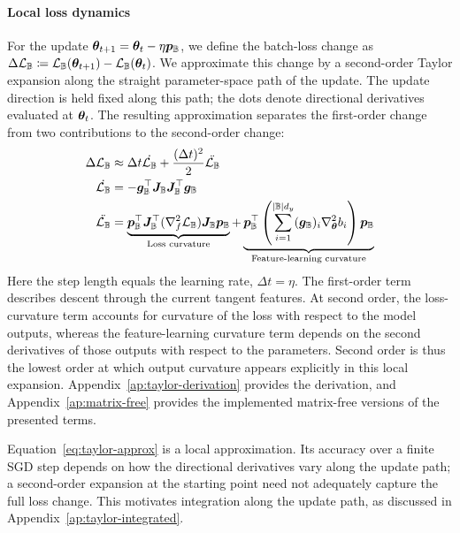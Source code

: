 \documentclass[10pt]{article} %
\newcommand{\batchloss}{\mathcal{L}_{\sB}}
\begin{document}
\paragraph{Local loss dynamics}
For the update ${\bm{\theta}}_{t+1} = {\bm{\theta}}_t - \eta{\bm{p}}_{\mathbb{B}}$, we define the batch-loss change as $\Delta\batchloss \coloneqq \batchloss(\vtheta_{t+1}) - \batchloss(\vtheta_t)$. We approximate this change by a second-order Taylor expansion along the straight parameter-space path of the update. The update direction is held fixed along this path; the dots denote directional derivatives evaluated at ${\bm{\theta}}_t$. The resulting approximation separates the first-order change from two contributions to the second-order change:
\begin{align}
    \Delta \batchloss &\approx \Delta t \dot{\batchloss} + \frac{(\Delta t)^2}{2} \ddot{\batchloss} \label{eq:taylor-approx} \\
    \dot{\batchloss} &= -\vg^\top_\sB \mJ_{\sB} \mJ^\top_{\sB} \vg_\sB \\
    \ddot{\batchloss} &= \underbrace{\vp_\sB^\top \mJ^\top_\sB (\nabla^2_f \batchloss) \mJ_\sB \vp_\sB }_{\text{Loss curvature}} + \underbrace{\vp_\sB^\top \left( \sum_{i=1}^{|\sB|d_y} (\vg_\sB)_i \nabla^2_\vtheta b_i \right) \vp_\sB }_{\text{Feature-learning curvature}}
\end{align}
Here the step length equals the learning rate, $\Delta t = \eta$. The first-order term describes descent through the current tangent features. At second order, the loss-curvature term accounts for curvature of the loss with respect to the model outputs, whereas the feature-learning curvature term depends on the second derivatives of those outputs with respect to the parameters. Second order is thus the lowest order at which output curvature appears explicitly in this local expansion. Appendix~\ref{ap:taylor-derivation} provides the derivation, and Appendix~\ref{ap:matrix-free} provides the implemented matrix-free versions of the presented terms. 

Equation~\ref{eq:taylor-approx} is a local approximation. Its accuracy over a finite SGD step depends on how the directional derivatives vary along the update path; a second-order expansion at the starting point need not adequately capture the full loss change. This motivates integration along the update path, as discussed in Appendix~\ref{ap:taylor-integrated}.
\end{document}
